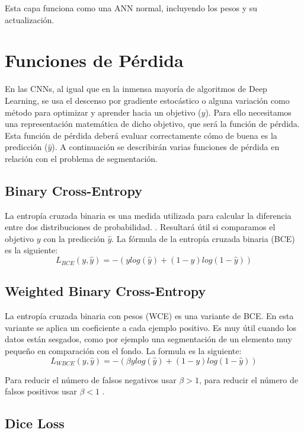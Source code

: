 Esta capa funciona como una ANN normal, incluyendo los pesos y su actualización.

\section{Funciones de Pérdida}

En las CNNs, al igual que en la inmensa mayoría de algoritmos de Deep Learning, se usa el descenso por gradiente estocástico o alguna variación como método para optimizar y aprender hacia un objetivo ($y$). Para ello necesitamos una representación matemática de dicho objetivo, que será la función de pérdida. Esta función de pérdida deberá evaluar correctamente cómo de buena es la predicción ($\hat{y}$). A continuación se describirán varias funciones de pérdida en relación con el problema de segmentación.

\subsection{Binary Cross-Entropy}

La entropía cruzada binaria es una medida utilizada para calcular la diferencia entre dos distribuciones de probabilidad. \cite{Jadon2020}. Resultará útil si comparamos el objetivo $y$ con la predicción $\hat{y}$. La fórmula de la entropía cruzada binaria (BCE) es la siguiente:
\begin{equation}
L_{BCE}(y,\hat{y})=-(y log(\hat{y}) + (1-y)log(1-\hat{y}))
\end{equation}

\subsection{Weighted Binary Cross-Entropy}

La entropía cruzada binaria con pesos (WCE) es una variante de BCE. En esta variante se aplica un coeficiente a cada ejemplo positivo. Es muy útil cuando los datos están sesgados, como por ejemplo una segmentación de un elemento muy pequeño en comparación con el fondo. La formula es la siguiente:
\begin{equation}
L_{WBCE}(y,\hat{y})=-(\beta y log(\hat{y}) + (1-y)log(1-\hat{y}))
\end{equation}

Para reducir el número de falsos negativos usar $\beta > 1$, para reducir el número de falsos positivos usar $\beta < 1$ \cite{Jadon2020}.

\subsection{Dice Loss}

